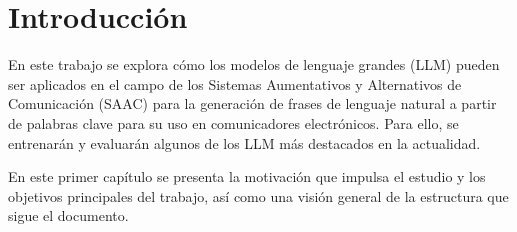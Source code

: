 \documentclass[11pt,spanish,listoffigures,listoftables]{tfgetsinf}
\begin{document}
\begin{abstract}[english]
Augmentative and Alternative Communication (AAC) systems are vital tools for facilitating communication for individuals with difficulties using language. These systems allow users to select pictograms associated with key words that will form the sentence that is wished to communicate. Then, the sentence can be synthesized with a human voice. Recent advances in the field of natural language processing, and specifically the proliferation of large language models, offer new perspectives for improving AAC systems. In particular, this work will explore how these language models can enhance the expressiveness of AAC communication when used to generate natural language from the key words (pictograms) selected by the user. In this way, this work will evaluate the performance of these models when adapted for integration into AAC systems. This evaluation will be carried out using real test sets in spanish and english extracted from the portal of the Aragonese Center for Augmentative and Alternative Communication.
\end{abstract}


\mainmatter


\chapter{Introducción} \label{cap1}

En este trabajo se explora cómo los modelos de lenguaje grandes (LLM) pueden ser aplicados en el campo de los Sistemas Aumentativos y Alternativos de Comunicación (SAAC) para la generación de frases de lenguaje natural a partir de palabras clave para su uso en comunicadores electrónicos. Para ello, se entrenarán y evaluarán algunos de los LLM más destacados en la actualidad.

En este primer capítulo se presenta la motivación que impulsa el estudio y los objetivos principales del trabajo, así como una visión general de la estructura que sigue el documento.
\end{document}
